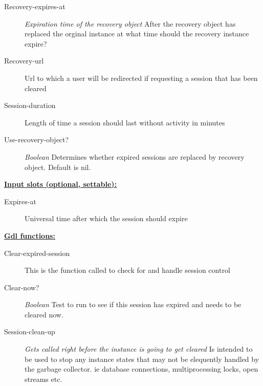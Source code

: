 \documentclass [11pt]{book}
\begin{document}
\begin{itemize}
\begin{description}
\item [Recovery-expires-at]
\emph{Expiration time of the recovery object} After the recovery object has replaced the orginal
instance at what time should the recovery instance expire?


\item [Recovery-url]
Url to which a user will be redirected if requesting a session that has been cleared


\item [Session-duration]
Length of time a session should last without activity in minutes


\item [Use-recovery-object?]
\emph{Boolean} Determines whether expired sessions are replaced by recovery object. Default is nil.


\end{description}






\textbf{
\underline{Input slots (optional, settable):}}

\begin{description}

\item [Expires-at]
Universal time after which the session should expire


\end{description}






\textbf{
\underline{Gdl functions:}}

\begin{description}

\item [Clear-expired-session]
This is the function called to check for and handle session control


\item [Clear-now?]
\emph{Boolean} Test to run to see if this session has expired and needs to be cleared now.


\item [Session-clean-up]
\emph{Gets called right before the instance is going to get cleared} Is intended to be used to stop any instance states that may not be elequently handled by the garbage collector. ie database connections, multiprocessing locks, open streams etc.



\end{description}
\end{itemize}
\end{document}
